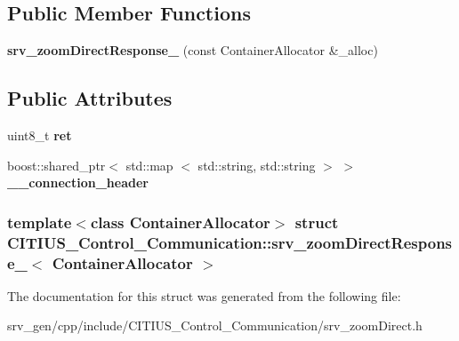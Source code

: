 \subsection*{\-Public \-Member \-Functions}
\begin{DoxyCompactItemize}
\item 
\hypertarget{struct_c_i_t_i_u_s___control___communication_1_1srv__zoom_direct_response___a25d0c783a13d16df98ffa9cedf8e7937}{{\bfseries srv\-\_\-zoom\-Direct\-Response\-\_\-} (const \-Container\-Allocator \&\-\_\-alloc)}\label{struct_c_i_t_i_u_s___control___communication_1_1srv__zoom_direct_response___a25d0c783a13d16df98ffa9cedf8e7937}

\end{DoxyCompactItemize}
\subsection*{\-Public \-Attributes}
\begin{DoxyCompactItemize}
\item 
\hypertarget{struct_c_i_t_i_u_s___control___communication_1_1srv__zoom_direct_response___a2f08591054840fa523993cab923c4e3d}{uint8\-\_\-t {\bfseries ret}}\label{struct_c_i_t_i_u_s___control___communication_1_1srv__zoom_direct_response___a2f08591054840fa523993cab923c4e3d}

\item 
\hypertarget{struct_c_i_t_i_u_s___control___communication_1_1srv__zoom_direct_response___a6ce00b1828fb705973e9f06a1b30f57d}{boost\-::shared\-\_\-ptr$<$ std\-::map\*
$<$ std\-::string, std\-::string $>$ $>$ {\bfseries \-\_\-\-\_\-connection\-\_\-header}}\label{struct_c_i_t_i_u_s___control___communication_1_1srv__zoom_direct_response___a6ce00b1828fb705973e9f06a1b30f57d}

\end{DoxyCompactItemize}
\subsubsection*{template$<$class Container\-Allocator$>$ struct C\-I\-T\-I\-U\-S\-\_\-\-Control\-\_\-\-Communication\-::srv\-\_\-zoom\-Direct\-Response\-\_\-$<$ Container\-Allocator $>$}



\-The documentation for this struct was generated from the following file\-:\begin{DoxyCompactItemize}
\item 
srv\-\_\-gen/cpp/include/\-C\-I\-T\-I\-U\-S\-\_\-\-Control\-\_\-\-Communication/srv\-\_\-zoom\-Direct.\-h\end{DoxyCompactItemize}
